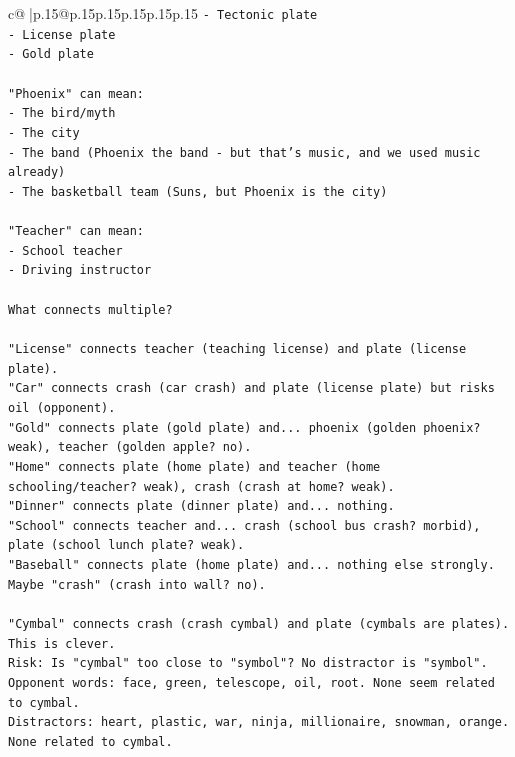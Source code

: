 \documentclass{article}
\begin{document}
{\begin{supertabular}{c@{$\;$}|p{.15\linewidth}@{}p{.15\linewidth}p{.15\linewidth}p{.15\linewidth}p{.15\linewidth}p{.15\linewidth}}
{{{\texttt{{-} Tectonic plate} \\
\texttt{{-} License plate} \\
\texttt{{-} Gold plate} \\
\\ 
\texttt{"Phoenix" can mean:} \\
\texttt{{-} The bird/myth} \\
\texttt{{-} The city} \\
\texttt{{-} The band (Phoenix the band {-} but that's music, and we used music already)} \\
\texttt{{-} The basketball team (Suns, but Phoenix is the city)} \\
\\ 
\texttt{"Teacher" can mean:} \\
\texttt{{-} School teacher} \\
\texttt{{-} Driving instructor} \\
\\ 
\texttt{What connects multiple?} \\
\\ 
\texttt{"License" connects teacher (teaching license) and plate (license plate).} \\
\texttt{"Car" connects crash (car crash) and plate (license plate) but risks oil (opponent).} \\
\texttt{"Gold" connects plate (gold plate) and... phoenix (golden phoenix? weak), teacher (golden apple? no).} \\
\texttt{"Home" connects plate (home plate) and teacher (home schooling/teacher? weak), crash (crash at home? weak).} \\
\texttt{"Dinner" connects plate (dinner plate) and... nothing.} \\
\texttt{"School" connects teacher and... crash (school bus crash? morbid), plate (school lunch plate? weak).} \\
\texttt{"Baseball" connects plate (home plate) and... nothing else strongly. Maybe "crash" (crash into wall? no).} \\
\\ 
\texttt{"Cymbal" connects crash (crash cymbal) and plate (cymbals are plates). This is clever.} \\
\texttt{Risk: Is "cymbal" too close to "symbol"? No distractor is "symbol".} \\
\texttt{Opponent words: face, green, telescope, oil, root. None seem related to cymbal.} \\
\texttt{Distractors: heart, plastic, war, ninja, millionaire, snowman, orange. None related to cymbal.} \\
}}}
\end{supertabular}}
\end{document}
